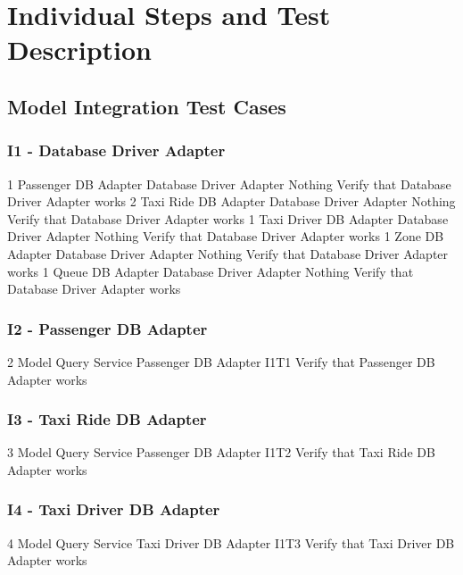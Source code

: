 \section{Individual Steps and Test Description}

\subsection{Model Integration Test Cases}
\subsubsection{I1 - Database Driver Adapter}
\testCaseSimple
	{1}
	{Passenger DB Adapter}
	{Database Driver Adapter}
	{Nothing}
	{Verify that Database Driver Adapter works}
\testCaseSimple
	{2}
	{Taxi Ride DB Adapter}
	{Database Driver Adapter}
	{Nothing}
	{Verify that Database Driver Adapter works}
\testCaseSimple
	{1}
	{Taxi Driver DB Adapter}
	{Database Driver Adapter}
	{Nothing}
	{Verify that Database Driver Adapter works}
\testCaseSimple
	{1}
	{Zone DB Adapter}
	{Database Driver Adapter}
	{Nothing}
	{Verify that Database Driver Adapter works}
\testCaseSimple
	{1}
	{Queue DB Adapter}
	{Database Driver Adapter}
	{Nothing}
	{Verify that Database Driver Adapter works}
\subsubsection{I2 - Passenger DB Adapter}
\testCaseSimple
	{2}
	{Model Query Service}
	{Passenger DB Adapter}
	{I1T1}
	{Verify that Passenger DB Adapter works}
\subsubsection{I3 - Taxi Ride DB Adapter}
\testCaseSimple
	{3}
	{Model Query Service}
	{Passenger DB Adapter}
	{I1T2}
	{Verify that Taxi Ride DB Adapter works}
\subsubsection{I4 - Taxi Driver DB Adapter}
\testCaseSimple
	{4}
	{Model Query Service}
	{Taxi Driver DB Adapter}
	{I1T3}
	{Verify that Taxi Driver DB Adapter works}
